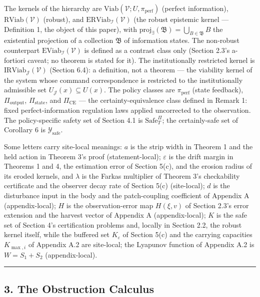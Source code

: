 \documentclass[11pt]{article}
\begin{document}
The kernels of the hierarchy are
\(\mathrm{Viab}(\mathcal{V}; U, \pi_{\mathrm{perf}})\) (perfect
information), \(\mathrm{RViab}(\mathcal{V})\) (robust), and
\(\mathrm{ERViab}_{\mathcal{I}}(\mathcal{V})\) (the robust epistemic
kernel --- Definition 1, the object of this paper), with
\(\mathrm{proj}_{\exists}(\mathfrak{B}) = \bigcup_{B \in \mathfrak{B}} B\)
the existential projection of a collection \(\mathfrak{B}\) of
information states. The non-robust counterpart
\(\mathrm{EViab}_{\mathcal{I}}(\mathcal{V})\) is defined as a contrast class only (Section 2.3's a-fortiori caveat; no theorem is stated for it). The institutionally restricted kernel is \(\mathrm{IRViab}_{\mathcal{J}}(\mathcal{V})\) (Section 6.4): a definition, not a theorem --- the viability kernel of the system whose command correspondence is restricted to the institutionally admissible set \(U_{\mathcal{J}}(x) \subseteq U(x)\). The policy classes
are \(\pi_{\mathrm{perf}}\) (state feedback), \(\Pi_{\mathrm{output}}\),
\(\Pi_{\mathrm{state}}\), and \(\Pi_{\mathrm{CE}}\) --- the
certainty-equivalence class defined in Remark 1: fixed
perfect-information regulation laws applied uncorrected to the
observation. The policy-specific safety set of Section 4.1 is
\(\mathrm{Safe}^{\Pi}_T\); the certainly-safe set of Corollary 6 is
\(\mathcal{Y}_{\mathrm{safe}}\).

Some letters carry site-local meanings: \(a\) is the strip width in Theorem 1 and the held action in
Theorem 3's proof (statement-local); \(\varepsilon\) is the drift margin
in Theorems 1 and 4, the estimation error of Section 5(c), and the
erosion radius of its eroded kernels, and \(\lambda\) is the Farkas
multiplier of Theorem 3's checkability certificate and the observer
decay rate of Section 5(c) (site-local); \(d\) is the disturbance input
in the body and the patch-coupling coefficient of Appendix A
(appendix-local); \(H\) is the observation-error map \(H(\xi, v)\) of
Section 2.3's error extension and the harvest vector of Appendix A
(appendix-local); \(K\) is the safe set of Section 4's certification
problems and, locally in Section 2.2, the robust kernel itself, while
the buffered set \(K_\varepsilon\) of Section 5(c) and the carrying
capacities \(K_{\max,i}\) of Appendix A.2 are site-local; the Lyapunov
function of Appendix A.2 is \(W = S_1 + S_2\) (appendix-local).

\begin{center}\rule{0.5\linewidth}{0.5pt}\end{center}

\subsection{3. The Obstruction Calculus}\label{the-obstruction-calculus}
\end{document}
